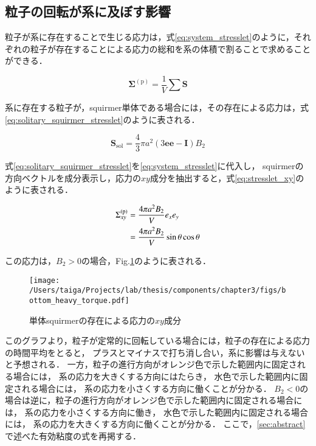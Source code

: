 \subsection{粒子の回転が系に及ぼす影響}
粒子が系に存在することで生じる応力は，式\eqref{eq:system_stresslet}のように，それぞれの粒子が存在することによる応力の総和を系の体積で割ることで求めることができる．

    \begin{equation}
        \boldsymbol{\Sigma}^\mathrm{(p)} = \frac{1}{V} \sum \boldsymbol{S}
        \label{eq:system_stresslet}
    \end{equation}

\noindent
系に存在する粒子が，squirmer単体である場合には，その存在による応力は，式\eqref{eq:solitary_squirmer_stresslet}のように表される．

    \begin{equation}
        \boldsymbol{S}_\mathrm{sol} = \frac{4}{3} \pi a^2 (3 \boldsymbol{ee} - \boldsymbol{I}) B_2
        \label{eq:solitary_squirmer_stresslet}
    \end{equation}

\noindent
式\eqref{eq:solitary_squirmer_stresslet}を\eqref{eq:system_stresslet}に代入し，
squirmerの方向ベクトルを成分表示し，応力の$xy$成分を抽出すると，式\eqref{eq:stresslet_xy}のように表される．

    \begin{align}
        \Sigma^\mathrm{(p)}_{xy} &= \frac{4 \pi a^2 B_2}{V} e_x e_y \notag \\
            &= \frac{4 \pi a^2 B_2}{V} \sin \theta \cos \theta
        \label{eq:stresslet_xy}
    \end{align}

\noindent
この応力は，$B_2 > 0$の場合，Fig.\ref{fig:stresslet_xy}のように表される．

    \begin{figure}[H]
        \centering
        \texttt{[image: /Users/taiga/Projects/lab/thesis/components/chapter3/figs/bottom\_heavy\_torque.pdf]}
        \caption{単体squirmerの存在による応力の$xy$成分}
        \label{fig:stresslet_xy}
    \end{figure}

\noindent
このグラフより，粒子が定常的に回転している場合には，粒子の存在による応力の時間平均をとると，
プラスとマイナスで打ち消し合い，系に影響は与えないと予想される．
一方，粒子の進行方向がオレンジ色で示した範囲内に固定される場合には，
系の応力を大きくする方向にはたらき，
水色で示した範囲内に固定される場合には，
系の応力を小さくする方向に働くことが分かる．
$B_2<0$の場合は逆に，粒子の進行方向がオレンジ色で示した範囲内に固定される場合には，
系の応力を小さくする方向に働き，
水色で示した範囲内に固定される場合には，
系の応力を大きくする方向に働くことが分かる．
ここで，\ref{sec:abstract}で述べた有効粘度の式を再掲する．

